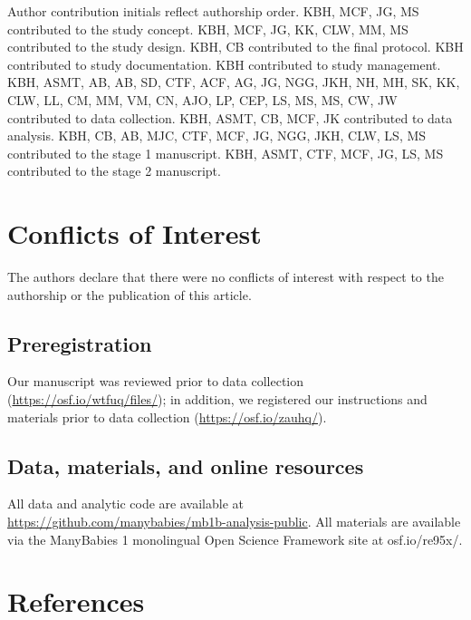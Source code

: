 \documentclass[,man,floatsintext]{apa6}
\begin{document}
Author contribution initials reflect authorship order. KBH, MCF, JG, MS contributed to the study concept. KBH, MCF, JG, KK, CLW, MM, MS contributed to the study design. KBH, CB contributed to the final protocol. KBH contributed to study documentation. KBH contributed to study management. KBH, ASMT, AB, AB, SD, CTF, ACF, AG, JG, NGG, JKH, NH, MH, SK, KK, CLW, LL, CM, MM, VM, CN, AJO, LP, CEP, LS, MS, MS, CW, JW contributed to data collection. KBH, ASMT, CB, MCF, JK contributed to data analysis. KBH, CB, AB, MJC, CTF, MCF, JG, NGG, JKH, CLW, LS, MS contributed to the stage 1 manuscript. KBH, ASMT, CTF, MCF, JG, LS, MS contributed to the stage 2 manuscript.

\hypertarget{conflicts-of-interest}{%
\section{Conflicts of Interest}\label{conflicts-of-interest}}

The authors declare that there were no conflicts of interest with respect to the authorship or the publication of this article.

\hypertarget{preregistration}{%
\subsection{Preregistration}\label{preregistration}}

Our manuscript was reviewed prior to data collection (\url{https://osf.io/wtfuq/files/}); in addition, we registered our instructions and materials prior to data collection (\url{https://osf.io/zauhq/}).

\hypertarget{data-materials-and-online-resources}{%
\subsection{Data, materials, and online resources}\label{data-materials-and-online-resources}}

All data and analytic code are available at \url{https://github.com/manybabies/mb1b-analysis-public}. All materials are available via the ManyBabies 1 monolingual Open Science Framework site at osf.io/re95x/.

\newpage

\hypertarget{references}{%
\section{References}\label{references}}
\end{document}
